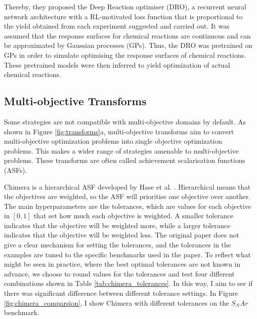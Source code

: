 Thereby, they proposed the Deep Reaction optimiser (DRO), a recurrent neural network architecture with a RL-motivated loss function that is proportional to the yield obtained from each experiment suggested and carried out. It was assumed that the response surfaces for chemical reactions are continuous and can be approximated by Gaussian processes (GPs). Thus, the DRO was pretrained on GPs in order to simulate optimising the response surfaces of chemical reactions. These pretrained models were then inferred to yield optimization of actual chemical reactions.

\subsection{Multi-objective Transforms}

Some strategies are not compatible with multi-objective domains by default. As shown in Figure \ref{fig:transforms}a, multi-objective transforms aim to convert multi-objective optimization problems into single objective optimization problems. This makes a wider range of strategies amenable to multi-objective problems. These transforms are often called achievement scalarisation functions (ASFs).

        



Chimera is a hierarchical ASF developed by Hase et al. \cite{Hase2018b, Hase2020a}. Hierarchical means that the objectives are weighted, so the ASF will prioritise one objective over another. The main hyperparameters are the tolerances, which are values for each objective in $[0,1]$ that set how much each objective is weighted. A smaller tolerance indicates that the objective will be weighted more, while a larger tolerance indicates that the objective will be weighted less. The original paper does not give a clear mechanism for setting the tolerances, and the tolerances in the examples are tuned to the specific benchmarks used in the paper. To reflect what might be seen in practice, where the best optimal tolerances are not known in advance, we choose to round values for the tolerances and test four different combinations shown in Table \ref{tab:chimera_tolerances}. In this way, I aim to see if there was significant difference between different tolerance settings. In Figure \ref{fig:chimera_comparsion}, I show Chimera with different tolerances on the $S_NAr$ benchmark.


